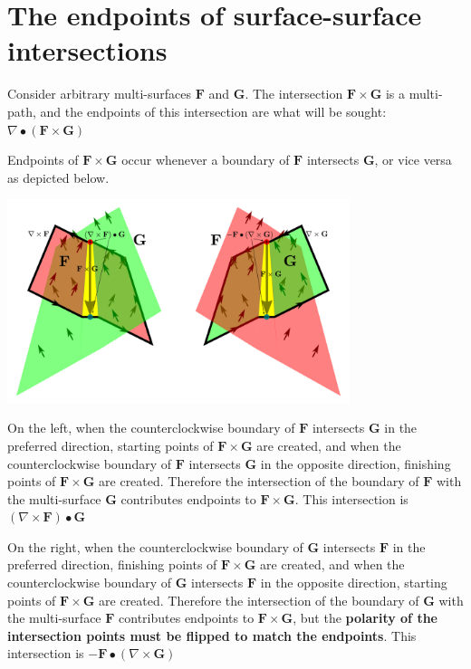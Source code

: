 \documentclass{book}
\begin{document}
\section{The endpoints of surface-surface intersections}

Consider arbitrary multi-surfaces \(\mathbf{F}\) and \(\mathbf{G}\). The intersection \(\mathbf{F} \times \mathbf{G}\) is a multi-path, and the endpoints of this intersection are what will be sought: \(\nabla \bullet (\mathbf{F} \times \mathbf{G})\)

Endpoints of \(\mathbf{F} \times \mathbf{G}\) occur whenever a boundary of \(\mathbf{F}\) intersects \(\mathbf{G}\), or vice versa as depicted below. 

\begin{center}
\includegraphics[width = 0.75\textwidth]{Boundaries/Path_endpoints/surface_surface_intersection_endpoints_2}
\end{center}

On the left, when the counterclockwise boundary of \(\mathbf{F}\) intersects \(\mathbf{G}\) in the preferred direction, starting points of \(\mathbf{F} \times \mathbf{G}\) are created, and when the counterclockwise boundary of \(\mathbf{F}\) intersects \(\mathbf{G}\) in the opposite direction, finishing points of \(\mathbf{F} \times \mathbf{G}\) are created. Therefore the intersection of the boundary of \(\mathbf{F}\) with the multi-surface \(\mathbf{G}\) contributes endpoints to \(\mathbf{F} \times \mathbf{G}\). This intersection is \((\nabla \times \mathbf{F}) \bullet \mathbf{G}\)

On the right, when the counterclockwise boundary of \(\mathbf{G}\) intersects \(\mathbf{F}\) in the preferred direction, finishing points of \(\mathbf{F} \times \mathbf{G}\) are created, and when the counterclockwise boundary of \(\mathbf{G}\) intersects \(\mathbf{F}\) in the opposite direction, starting points of \(\mathbf{F} \times \mathbf{G}\) are created. Therefore the intersection of the boundary of \(\mathbf{G}\) with the multi-surface \(\mathbf{F}\) contributes endpoints to \(\mathbf{F} \times \mathbf{G}\), but the {\bf polarity of the intersection points must be flipped to match the endpoints}. This intersection is \(-\mathbf{F} \bullet (\nabla \times \mathbf{G})\)
\end{document}
